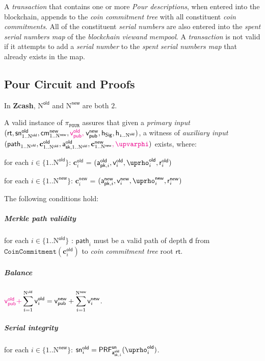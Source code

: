 \documentclass{article}
\newcommand{\changedcolor}{magenta}
\newcommand{\setchanged}{\color{\changedcolor}}
\newcommand{\changed}[1]{{\setchanged{#1}}}
\newcommand{\term}[1]{\textsl{#1}\xspace}
\newcommand{\termbf}[1]{\textbf{#1}\xspace}
\newcommand{\Zcash}{\termbf{Zcash}}
\newcommand{\coinCommitments}{\term{coin commitments}}
\newcommand{\coinCommitmentTree}{\term{coin commitment tree}}
\newcommand{\PourDescriptions}{\term{Pour descriptions}}
\newcommand{\transaction}{\term{transaction}}
\newcommand{\blockchainview}{\term{blockchain view}}
\newcommand{\mempool}{\term{mempool}}
\newcommand{\serialNumber}{\term{serial number}}
\newcommand{\serialNumbers}{\term{serial numbers}}
\newcommand{\spentSerialsMap}{\term{spent serial numbers map}}
\newcommand{\AuthPublicOld}[1]{\mathsf{a^{old}_{pk,\mathnormal{#1}}}}
\newcommand{\AuthPrivateOld}[1]{\mathsf{a^{old}_{sk,\mathnormal{#1}}}}
\newcommand{\AuthPublicNew}[1]{\mathsf{a^{new}_{pk,\mathnormal{#1}}}}
\newcommand{\CoinCommitRandOld}[1]{\mathsf{r^{old}_\mathnormal{#1}}}
\newcommand{\CoinCommitRandNew}[1]{\mathsf{r^{new}_\mathnormal{#1}}}
\newcommand{\CoinAddressRandOld}[1]{\mathsf{\uprho^{old}_\mathnormal{#1}}}
\newcommand{\CoinAddressRandNew}[1]{\mathsf{\uprho^{new}_\mathnormal{#1}}}
\newcommand{\CoinAddressPreRand}{\mathsf{\upvarphi}}
\newcommand{\PRF}[2]{\mathsf{{PRF}^{#2}_\mathnormal{#1}}}
\newcommand{\PRFsn}[1]{\PRF{#1}{sn}}
\newcommand{\cmNew}[1]{\mathsf{{cm}^{new}_\mathnormal{#1}}}
\newcommand{\MerkleDepth}{\mathsf{d}}
\newcommand{\snOld}[1]{\mathsf{{sn}^{old}_\mathnormal{#1}}}
\newcommand{\vsum}[2]{\smashoperator[r]{\sum_{#1}^{#2}}}
\newcommand{\rt}{\mathsf{rt}}
\newcommand{\hSig}{\mathsf{h_{Sig}}}
\newcommand{\h}[1]{\mathsf{h_{\mathnormal{#1}}}}
\newcommand{\NOld}{\mathrm{N}^\mathsf{old}}
\newcommand{\NNew}{\mathrm{N}^\mathsf{new}}
\newcommand{\PourStatement}{\texttt{POUR}}
\newcommand{\PourProof}{\pi_{\PourStatement}}
\newcommand{\vpubOld}{\mathsf{v_{pub}^{old}}}
\newcommand{\vpubNew}{\mathsf{v_{pub}^{new}}}
\newcommand{\cOld}[1]{\mathbf{c}_{#1}^\mathsf{old}}
\newcommand{\cNew}[1]{\mathbf{c}_{#1}^\mathsf{new}}
\newcommand{\vOld}[1]{\mathsf{v}_{#1}^\mathsf{old}}
\newcommand{\vNew}[1]{\mathsf{v}_{#1}^\mathsf{new}}
\newcommand{\treepath}[1]{\mathsf{path}_{#1}}
\newcommand{\CoinCommitment}{\mathtt{CoinCommitment}}
\begin{document}
A \transaction that contains one or more \PourDescriptions, when entered into the 
blockchain, appends to the \coinCommitmentTree with all constituent 
\coinCommitments. All of the constituent \serialNumbers are also entered into the 
\spentSerialsMap of the \blockchainview \emph{and} \mempool. A \transaction is not 
valid if it attempts to add a \serialNumber to the \spentSerialsMap that already 
exists in the map.

\subsection{Pour Circuit and Proofs}

In \Zcash, $\NOld$ and $\NNew$ are both $2$.

A valid instance of $\PourProof$ assures that given a \term{primary input}
$(\rt, \snOld{\mathrm{1}..\NOld}, \cmNew{\mathrm{1}..\NNew}, \changed{\vpubOld,\;}
\vpubNew, \hSig, \h{1..\NOld})$, a witness of \term{auxiliary input}
$(\treepath{1..\NOld}, \cOld{1..\NOld}, \AuthPrivateOld{\mathrm{1}..\NOld},
\cNew{1..\NNew}\changed{, \CoinAddressPreRand})$ exists, where:

\begin{list}{}{}

\item for each $i \in \{1..\NOld\}$: $\cOld{i}$ = $(\AuthPublicOld{i},
\vOld{i}, \CoinAddressRandOld{i}, \CoinCommitRandOld{i})$

\item for each $i \in \{1..\NNew\}$: $\cNew{i}$ = $(\AuthPublicNew{i},
\vNew{i}, \CoinAddressRandNew{i}, \CoinCommitRandNew{i})$

\item The following conditions hold:

\end{list}

\subparagraph{Merkle path validity}

for each $i \in \{1..\NOld\}$ \changed{$\mid$ $\vOld{i} \neq 0$}:
$\treepath{i}$ must be a valid path of depth $\MerkleDepth$ from
$\CoinCommitment(\cOld{i})$ to \coinCommitmentTree root $\rt$.

\subparagraph{Balance}

$\changed{\vpubOld +} \vsum{i=1}{\NOld} \vOld{i} = \vpubNew + \vsum{i=1}{\NNew} \vNew{i}$.

\subparagraph{Serial integrity}

for each $i \in \{1..\NNew\}$: 
$\snOld{i} = \PRFsn{\AuthPrivateOld{i}}(\CoinAddressRandOld{i})$.
\end{document}
